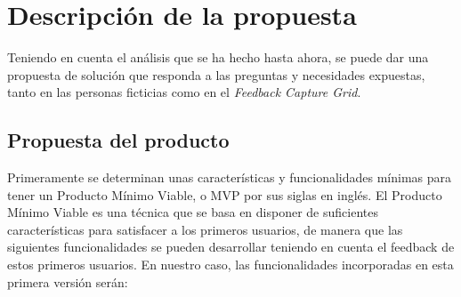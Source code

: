 \section{Descripción de la propuesta}

Teniendo en cuenta el análisis que se ha hecho hasta ahora, se puede dar una propuesta de solución que responda a las preguntas y necesidades expuestas, tanto en las personas ficticias como en el \textit{Feedback Capture Grid}.

\subsection{Propuesta del producto}

Primeramente se determinan unas características y funcionalidades mínimas para tener un Producto Mínimo Viable, o MVP por sus siglas en inglés. El Producto Mínimo Viable es una técnica que se basa en disponer de suficientes características para satisfacer a los primeros usuarios, de manera que las siguientes funcionalidades se pueden desarrollar teniendo en cuenta el feedback de estos primeros usuarios.\cite{mvp} En nuestro caso, las funcionalidades incorporadas en esta primera versión serán:

